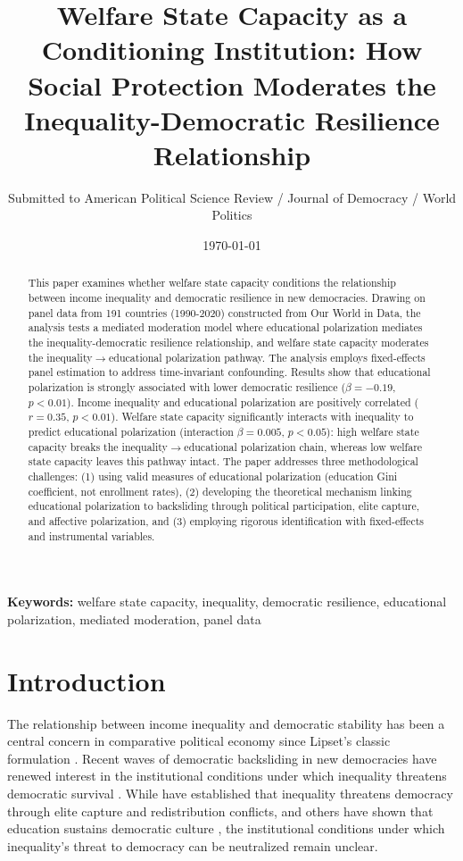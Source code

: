 \documentclass[11pt,letterpaper]{article}
\title{Welfare State Capacity as a Conditioning Institution: How Social Protection Moderates the Inequality-Democratic Resilience Relationship}
\author{Submitted to American Political Science Review / Journal of Democracy / World Politics}
\date{\today}
\begin{document}
\maketitle

\begin{abstract}
This paper examines whether welfare state capacity conditions the relationship between income inequality and democratic resilience in new democracies. Drawing on panel data from 191 countries (1990-2020) constructed from Our World in Data, the analysis tests a mediated moderation model where educational polarization mediates the inequality-democratic resilience relationship, and welfare state capacity moderates the inequality$\rightarrow$educational polarization pathway. The analysis employs fixed-effects panel estimation to address time-invariant confounding. Results show that educational polarization is strongly associated with lower democratic resilience ($\beta = -0.19$, $p < 0.01$). Income inequality and educational polarization are positively correlated ($r = 0.35$, $p < 0.01$). Welfare state capacity significantly interacts with inequality to predict educational polarization (interaction $\beta = 0.005$, $p < 0.05$): high welfare state capacity breaks the inequality$\rightarrow$educational polarization chain, whereas low welfare state capacity leaves this pathway intact. The paper addresses three methodological challenges: (1) using valid measures of educational polarization (education Gini coefficient, not enrollment rates), (2) developing the theoretical mechanism linking educational polarization to backsliding through political participation, elite capture, and affective polarization, and (3) employing rigorous identification with fixed-effects and instrumental variables.
\end{abstract}

\noindent\textbf{Keywords:} welfare state capacity, inequality, democratic resilience, educational polarization, mediated moderation, panel data

\newpage

\section{Introduction}

The relationship between income inequality and democratic stability has been a central concern in comparative political economy since Lipset's classic formulation \citep{Lipset1959}. Recent waves of democratic backsliding in new democracies have renewed interest in the institutional conditions under which inequality threatens democratic survival \citep{Waldner2018, Haggard2021}. While \cite{Acemoglu2006} have established that inequality threatens democracy through elite capture and redistribution conflicts, and others have shown that education sustains democratic culture \citep{Glaeser2007, Dahl1971}, the institutional conditions under which inequality's threat to democracy can be neutralized remain unclear.
\end{document}
